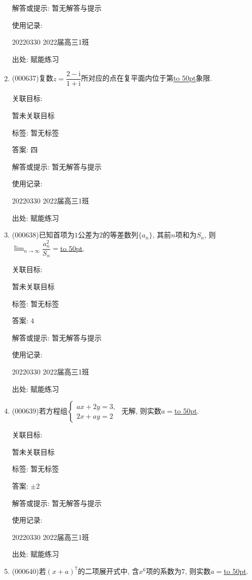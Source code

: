 \documentclass[10pt,a4paper]{article}
\newcommand{\blank}[1]{\underline{\hbox to #1pt{}}}
\begin{document}
\begin{enumerate}[1.]
解答或提示: 暂无解答与提示

使用记录:

20220330	2022届高三1班	


出处: 赋能练习
\item { (000637)}复数$z=\dfrac{2-\mathrm{i}}{1+\mathrm{i}}$所对应的点在复平面内位于第\blank{50}象限.


关联目标:

暂未关联目标



标签: 暂无标签

答案: 四

解答或提示: 暂无解答与提示

使用记录:

20220330	2022届高三1班	


出处: 赋能练习
\item { (000638)}已知首项为$1$公差为$2$的等差数列$\{a_n\}$, 其前$n$项和为$S_n$, 则$\displaystyle\lim_{n\to\infty}\dfrac{a_n^2}{S_n}=$\blank{50}.


关联目标:

暂未关联目标



标签: 暂无标签

答案: $4$

解答或提示: 暂无解答与提示

使用记录:

20220330	2022届高三1班	


出处: 赋能练习
\item { (000639)}若方程组$\begin{cases} ax+2y=3, \\ 2x+ay=2 \end{cases}$ 无解, 则实数$a=$\blank{50}.


关联目标:

暂未关联目标



标签: 暂无标签

答案: $\pm 2$

解答或提示: 暂无解答与提示

使用记录:

20220330	2022届高三1班	


出处: 赋能练习
\item { (000640)}若$(x+a)^7$的二项展开式中, 含$x^6$项的系数为$7$, 则实数$a=$\blank{50}.



\end{enumerate}
\end{document}
